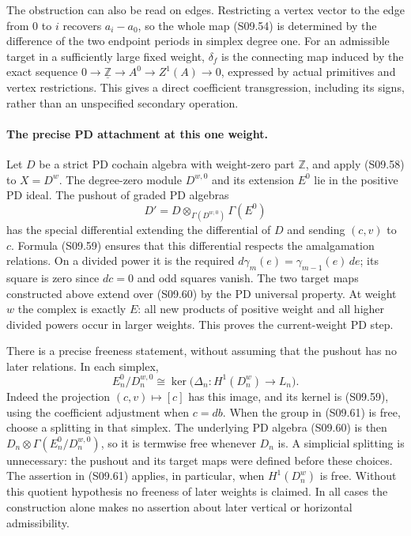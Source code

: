 The obstruction can also be read on edges.  Restricting
a vertex vector to the edge from $0$ to $i$ recovers
$a_i-a_0$, so the whole map (S09.54) is determined by
the difference of the two endpoint periods in simplex
degree one.  For an admissible target in a sufficiently
large fixed weight, $\delta_f$ is the connecting map
induced by the exact sequence
$0\to\underline{\mathbb Z}\to A^0\to Z^1(A)\to0$,
expressed by actual primitives and vertex restrictions.
This gives a direct coefficient transgression, including
its signs, rather than an unspecified secondary operation.

\paragraph{The precise PD attachment at this one weight.}
Let $D$ be a strict PD cochain algebra with weight-zero
part $\mathbb Z$, and apply (S09.58) to $X=D^w$.
The degree-zero module $D^{w,0}$ and its extension
$E^0$ lie in the positive PD ideal.  The pushout of
graded PD algebras
\[
 D'=D\mathop{\otimes}_{\Gamma(D^{w,0})}\Gamma(E^0)
 \tag{S09.60}
\]
has the special differential extending the differential
of $D$ and sending $(c,v)$ to $c$.  Formula (S09.59)
ensures that this differential respects the amalgamation
relations.  On a divided power it is the required
$d\gamma_m(e)=\gamma_{m-1}(e)\,de$; its square is
zero since $dc=0$ and odd squares vanish.  The two
target maps constructed above extend over (S09.60)
by the PD universal property.  At weight $w$ the
complex is exactly $E$: all new products of positive
weight and all higher divided powers occur in larger
weights.  This proves the current-weight PD step.

There is a precise freeness statement, without
assuming that the pushout has no later relations.
In each simplex,
\[
 E_n^0/D_n^{w,0}
       \cong\ker\bigl(\Delta_n:H^1(D_n^w)\to L_n\bigr).
 \tag{S09.61}
\]
Indeed the projection $(c,v)\mapsto[c]$ has this
image, and its kernel is (S09.59), using the coefficient
adjustment when $c=db$.  When the group in (S09.61)
is free, choose a splitting in that simplex.
The underlying PD algebra (S09.60) is then
$D_n\otimes\Gamma(E_n^0/D_n^{w,0})$, so it is
termwise free whenever $D_n$ is.  A simplicial splitting
is unnecessary: the pushout and its target maps were
defined before these choices.  The assertion in
(S09.61) applies, in particular, when $H^1(D_n^w)$
is free.  Without this quotient hypothesis no freeness
of later weights is claimed.  In all cases the
construction alone makes no assertion about later
vertical or horizontal admissibility.


